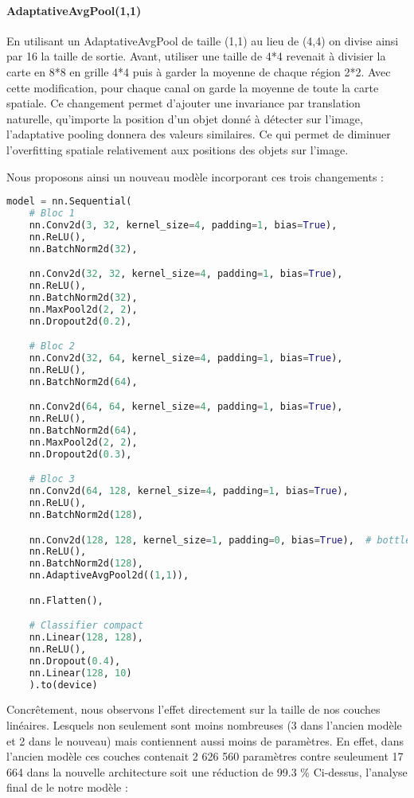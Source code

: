 \documentclass[12pt,a4paper]{article}
\begin{document}
\paragraph{AdaptativeAvgPool(1,1)}
En utilisant un AdaptativeAvgPool de taille (1,1) au lieu de (4,4) on divise ainsi par 16 la taille de sortie. Avant, utiliser une taille de 4*4 revenait à divisier la carte en 8*8 en grille 4*4 puis à garder la moyenne 
de chaque région 2*2. Avec cette modification, pour chaque canal on garde la moyenne de toute la carte spatiale. Ce changement 
permet d'ajouter une invariance par translation naturelle, qu'importe la position d'un objet donné à détecter sur l'image, l'adaptative pooling donnera des valeurs similaires. 
Ce qui permet de diminuer l'overfitting spatiale relativement aux positions des objets sur l'image. 

Nous proposons ainsi un nouveau modèle incorporant ces trois changements : 
\begin{lstlisting}[language=Python]
model = nn.Sequential(
    # Bloc 1
    nn.Conv2d(3, 32, kernel_size=4, padding=1, bias=True),
    nn.ReLU(),
    nn.BatchNorm2d(32),

    nn.Conv2d(32, 32, kernel_size=4, padding=1, bias=True),
    nn.ReLU(),
    nn.BatchNorm2d(32),
    nn.MaxPool2d(2, 2),
    nn.Dropout2d(0.2),

    # Bloc 2
    nn.Conv2d(32, 64, kernel_size=4, padding=1, bias=True),
    nn.ReLU(),
    nn.BatchNorm2d(64),

    nn.Conv2d(64, 64, kernel_size=4, padding=1, bias=True),
    nn.ReLU(),
    nn.BatchNorm2d(64),
    nn.MaxPool2d(2, 2),
    nn.Dropout2d(0.3),

    # Bloc 3
    nn.Conv2d(64, 128, kernel_size=4, padding=1, bias=True),
    nn.ReLU(),
    nn.BatchNorm2d(128),

    nn.Conv2d(128, 128, kernel_size=1, padding=0, bias=True),  # bottleneck
    nn.ReLU(),
    nn.BatchNorm2d(128),
    nn.AdaptiveAvgPool2d((1,1)),

    nn.Flatten(),

    # Classifier compact
    nn.Linear(128, 128),
    nn.ReLU(),
    nn.Dropout(0.4),
    nn.Linear(128, 10)
    ).to(device)
\end{lstlisting}

Concrêtement, nous observons l'effet directement sur la taille de nos couches linéaires. Lesquels non seulement sont moins nombreuses (3 dans l'ancien modèle et 2 dans le nouveau) mais contiennent aussi moins de paramètres. 
En effet, dans l'ancien modèle ces couches contenait 2 626 560 paramètres contre seuleument 17 664 dans la nouvelle architecture soit une réduction de 99.3 \%
Ci-dessus, l'analyse final de le notre modèle : 
\end{document}

